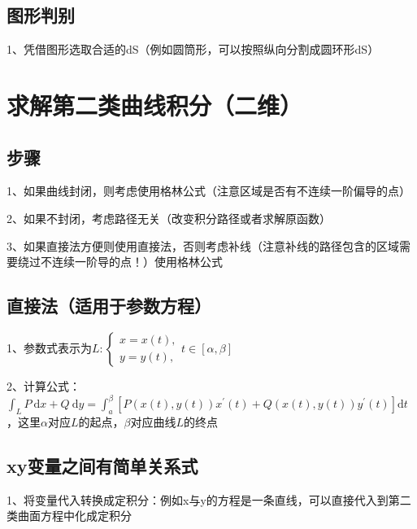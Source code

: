 \subsection{图形判别}

1、凭借图形选取合适的dS（例如圆筒形，可以按照纵向分割成圆环形dS）

\section{求解第二类曲线积分（二维）}



\subsection{步骤}

1、如果曲线封闭，则考虑使用格林公式（注意区域是否有不连续一阶偏导的点）

2、如果不封闭，考虑路径无关（改变积分路径或者求解原函数）

3、如果直接法方便则使用直接法，否则考虑补线（注意补线的路径包含的区域需要绕过不连续一阶导的点！）使用格林公式



\subsection{直接法（适用于参数方程）}

1、参数式表示为$ L:\left\{\begin{array}{l}x=x(t), \\ y=y(t),\end{array} t \in[\alpha, \beta]\right. $

2、计算公式：$ \int_{L} P \mathrm{~d} x+Q \mathrm{~d} y=\int_{a}^{\beta}\left[P(x(t), y(t)) x^{\prime}(t)+Q(x(t), y(t)) y^{\prime}(t)\right] \mathrm{d} t $，这里$ \alpha $对应$ L $的起点，$ \beta $对应曲线$ L $的终点



\subsection{xy变量之间有简单关系式}

1、将变量代入转换成定积分：例如x与y的方程是一条直线，可以直接代入到第二类曲面方程中化成定积分

